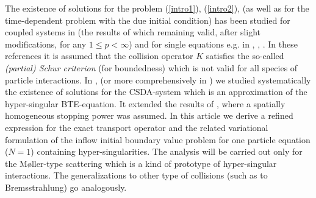 \documentclass[a4paper,12pt,oneside,reqno]{amsart}
\theoremstyle{theorem}
\begin{document}
The existence of solutions for the problem (\ref{intro1}), (\ref{intro2}),
(as well as for the time-dependent problem with the due initial condition) has been studied for  coupled systems  in \cite{tervo17-up}
(the results of which remaining valid, after slight modifications, for any $1\leq p<\infty$) and for  single equations e.g. in \cite{egger14}, \cite{dautraylionsv6}, \cite{agoshkov}.
In these references it is assumed that the 
collision operator $K$ satisfies the so-called \emph{(partial) Schur criterion} (for boundedness) which is not valid for all species of particle interactions.
In \cite{tervo17}, \cite{tervo18} (or more comprehensively in \cite{tervo18-up}) we studied systematically the existence of solutions for the CSDA-system which is an approximation of the hyper-singular BTE-equation.
It extended the results of \cite{frank10}, where a spatially homogeneous stopping power was assumed. 
In this article we derive a refined expression for the exact transport operator and the related variational formulation of the inflow initial boundary value problem for one particle equation ($N=1$) containing hyper-singularities. 
The analysis will be carried out only for the M\o ller-type scattering which is a kind of prototype of hyper-singular interactions. The generalizations to other type of collisions (such as to Bremsstrahlung) go analogously.
\end{document}
